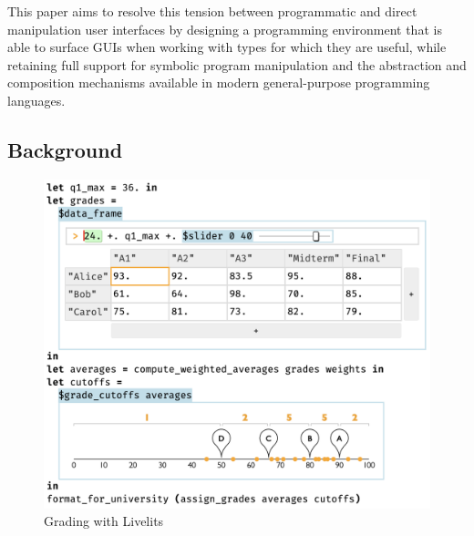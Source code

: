 
This paper aims to resolve this tension between
programmatic and direct manipulation user interfaces by designing 
a programming environment that
is able to surface GUIs when working with types for which
they are useful, while retaining full support for symbolic program manipulation
and the abstraction and composition mechanisms
available in modern general-purpose programming languages.

\subsection{Background}\label{sec:background}
\begin{figure}
  \includegraphics[width=29pc]{grade-cutoff-livelit.png}
\caption{Grading with Livelits}
\label{fig:grading}
\label{fig:color}
\end{figure}

